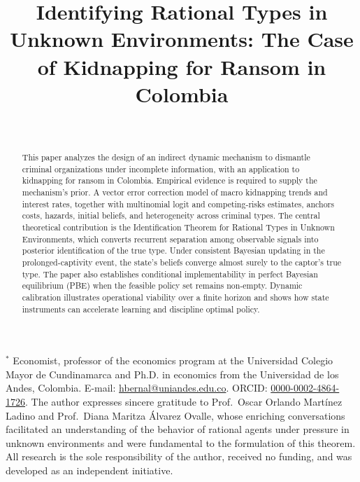 \documentclass[ecta,nameyear,draft]{econsocart}
\theoremstyle{plain}
\theoremstyle{definition}
\newcommand{\1}{\mathbf{1}}
\begin{document}
\begin{frontmatter}

\title{Identifying Rational Types in Unknown Environments: The Case of Kidnapping for Ransom in Colombia}

\begin{aug}
\author[add1,add2]{~}
\address[add1]{%
,
}
\address[add2]{%
,
}
\end{aug}

\begin{funding}
$^*$ Economist, professor of the economics program at the Universidad Colegio Mayor de Cundinamarca and Ph.D. in economics from the Universidad de los Andes, Colombia. E-mail: \href{mailto:hbernal@uniandes.edu.co}{hbernal@uniandes.edu.co}. ORCID: \href{https://orcid.org/0000-0002-4864-1726}{0000-0002-4864-1726}. The author expresses sincere gratitude to Prof.\ Oscar Orlando Mart\'inez Ladino and Prof.\ Diana Maritza \'Alvarez Ovalle, whose enriching conversations facilitated an understanding of the behavior of rational agents under pressure in unknown environments and were fundamental to the formulation of this theorem. All research is the sole responsibility of the author, received no funding, and was developed as an independent initiative.
\end{funding}

\begin{abstract}
This paper analyzes the design of an indirect dynamic mechanism to dismantle criminal organizations under incomplete information, with an application to kidnapping for ransom in Colombia. Empirical evidence is required to supply the mechanism's prior. A vector error correction model of macro kidnapping trends and interest rates, together with multinomial logit and competing-risks estimates, anchors costs, hazards, initial beliefs, and heterogeneity across criminal types. The central theoretical contribution is the Identification Theorem for Rational Types in Unknown Environments, which converts recurrent separation among observable signals into posterior identification of the true type. Under consistent Bayesian updating in the prolonged-captivity event, the state's beliefs converge almost surely to the captor's true type. The paper also establishes conditional implementability in perfect Bayesian equilibrium (PBE) when the feasible policy set remains non-empty. Dynamic calibration illustrates operational viability over a finite horizon and shows how state instruments can accelerate learning and discipline optimal policy.
\end{abstract}


\end{frontmatter}
\end{document}
